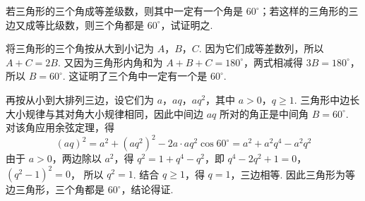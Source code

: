 \documentclass[UTF8,a4paper,oneside,11pt]{ctexbook}
\begin{document}
\begin{problem}
若三角形的三个角成等差级数，则其中一定有一个角是 \(60^{\circ}\)；若这样的三角形的三边又成等比级数，则三个角都是 \(60^{\circ}\)，试证明之.
\end{problem}

\begin{solution}
将三角形的三个角按从大到小记为 \(A\)，\(B\)，\(C\). 因为它们成等差数列，所以 \(A+C=2B\). 又因为三角形内角和为 \(A+B+C=180^{\circ}\)，两式相减得 \(3B=180^{\circ}\)，所以 \(B=60^{\circ}\). 这证明了三个角中一定有一个是 \(60^{\circ}\).

再按从小到大排列三边，设它们为 \(a\)，\(aq\)，\(aq^{2}\)，其中 \(a>0\)，\(q\geq1\). 三角形中边长大小规律与其对角大小规律相同，因此中间边 \(aq\) 所对的角正是中间角 \(B=60^{\circ}\). 对该角应用余弦定理，得
\[
(aq)^{2}=a^{2}+(aq^{2})^{2}-2a\cdot aq^{2}\cos60^{\circ}=a^{2}+a^{2}q^{4}-a^{2}q^{2}
\]
由于 \(a>0\)，两边除以 \(a^{2}\)，得 \(q^{2}=1+q^{4}-q^{2}\)，即
\(q^{4}-2q^{2}+1=0\)，\(\left(q^{2}-1\right)^{2}=0\)，
所以 \(q^{2}=1\). 结合 \(q\geq1\)，得 \(q=1\)，三边相等. 因此三角形为等边三角形，三个角都是 \(60^{\circ}\)，结论得证.
\end{solution}

\end{document}
